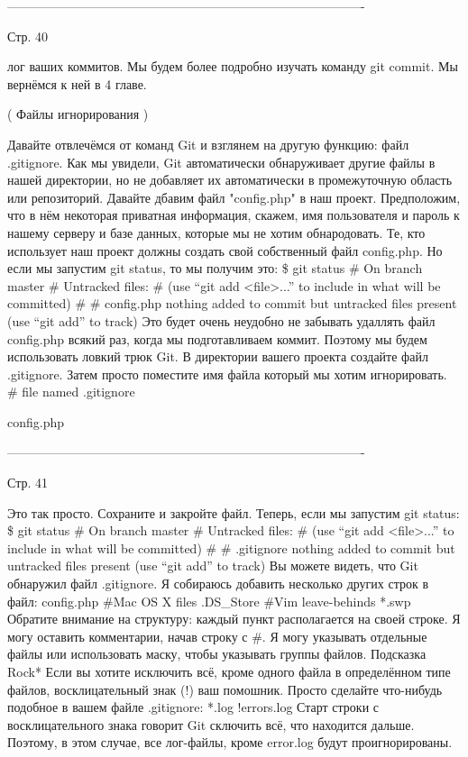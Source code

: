 -------------------------------------------------------------------------------------

Стр. 40

лог ваших коммитов. Мы будем более подробно изучать команду git commit. Мы вернёмся к
ней в 4 главе.

( Файлы игнорирования )

Давайте отвлечёмся от команд Git и взглянем на другую функцию: файл .gitignore. Как мы
увидели, Git автоматически обнаруживает другие файлы в нашей директории, но не 
добавляет их автоматически в промежуточную область или репозиторий. Давайте дбавим файл
"config.php" в наш проект. Предположим, что в нём некоторая приватная информация, скажем,
имя пользователя и пароль к нашему серверу и базе данных, которые мы не хотим 
обнародовать. Те, кто использует наш проект должны создать свой собственный файл 
config.php. Но если мы запустим git status, то мы получим это:
\$ git status
# On branch master
# Untracked files:
#
(use “git add <file>...” to include in what will be
committed)
#
#       
config.php
nothing added to commit but untracked files present (use
“git add” to track)
Это будет очень неудобно не забывать удаллять файл config.php всякий раз, когда мы 
подготавливаем коммит. Поэтому мы будем использовать ловкий трюк Git. В директории
вашего проекта создайте файл .gitignore. Затем просто поместите имя файла который
мы хотим игнорировать.
# file named .gitignore
       
config.php

-------------------------------------------------------------------------------------

Стр. 41

Это так просто. Сохраните и закройте файл. Теперь, если мы запустим git status:
\$ git status
# On branch master
# Untracked files:
#
(use “git add <file>...” to include in what will be
committed)
#
#       
.gitignore
nothing added to commit but untracked files present (use
“git add” to track)
Вы можете видеть, что Git обнаружил файл .gitignore. Я собираюсь добавить несколько
других строк в файл:
config.php
#Mac OS X files
.DS_Store
#Vim leave-behinds
*.swp
Обратите внимание на структуру: каждый пункт располагается на своей строке. Я могу
оставить комментарии, начав строку с #. Я могу указывать отдельные файлы или 
использовать маску, чтобы указывать группы файлов.
        Подсказка Rock*
        Если вы хотите исключить всё, кроме одного файла в определённом типе файлов,
        восклицательный знак (!) ваш помошник. Просто сделайте что-нибудь подобное в 
        вашем файле .gitignore:
        *.log
        !errors.log
        Старт строки с восклицательного знака говорит Git сключить всё, что находится 
        дальше. Поэтому, в этом случае, все лог-файлы, кроме error.log будут 
        проигнорированы.

